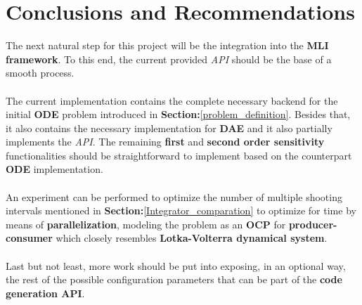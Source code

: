 \documentclass[12pt, letterpaper]{article}
\begin{document}
\section{Conclusions and Recommendations}
\label{conclusions_recommandations}

The next natural step for this project will be the integration into the \textbf{MLI framework}. To this end, the current provided \textit{API} should be the base of a smooth process. 
\\
\\
The current implementation contains the complete necessary backend for the initial \textbf{ODE} problem introduced in \textbf{Section:}\ref{problem_definition}. Besides that, it also contains the necessary implementation for \textbf{DAE} and it also partially implements the \textit{API}. The remaining \textbf{first} and \textbf{second order sensitivity} functionalities should be straightforward to implement based on the counterpart \textbf{ODE} implementation.
\\
\\
An experiment can be performed to optimize the number of multiple shooting intervals mentioned in \textbf{Section:}\ref{Integrator_comparation} to optimize for time by means of \textbf{parallelization}, modeling the problem as an \textbf{OCP} for \textbf{producer-consumer} which closely resembles \textbf{Lotka-Volterra dynamical system}.
\\
\\
Last but not least, more work should be put into exposing, in an optional way, the rest of the possible configuration parameters that can be part of the \textbf{code generation API}.
\\
\\
\\
\\
\\
\\
\\
\\
\\
\\
\\
\\

%




\end{document}
